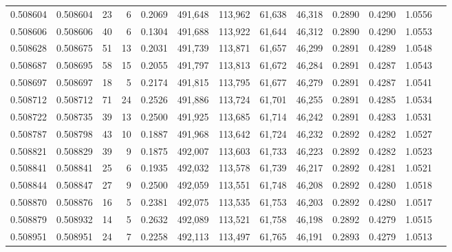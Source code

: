 \begin{tabular}{rrrrrrrrrrrrr}
0.508604 & 0.508604 &    23 &     6 &                                     0.2069 & 491,648 & 113,962 &  61,638 &  46,318 & 0.2890 & 0.4290 & 1.0556 \\
0.508606 & 0.508606 &    40 &     6 &                                     0.1304 & 491,688 & 113,922 &  61,644 &  46,312 & 0.2890 & 0.4290 & 1.0553 \\
0.508628 & 0.508675 &    51 &    13 &                                     0.2031 & 491,739 & 113,871 &  61,657 &  46,299 & 0.2891 & 0.4289 & 1.0548 \\
0.508687 & 0.508695 &    58 &    15 &                                     0.2055 & 491,797 & 113,813 &  61,672 &  46,284 & 0.2891 & 0.4287 & 1.0543 \\
0.508697 & 0.508697 &    18 &     5 &                                     0.2174 & 491,815 & 113,795 &  61,677 &  46,279 & 0.2891 & 0.4287 & 1.0541 \\
0.508712 & 0.508712 &    71 &    24 &                                     0.2526 & 491,886 & 113,724 &  61,701 &  46,255 & 0.2891 & 0.4285 & 1.0534 \\
0.508722 & 0.508735 &    39 &    13 &                                     0.2500 & 491,925 & 113,685 &  61,714 &  46,242 & 0.2891 & 0.4283 & 1.0531 \\
0.508787 & 0.508798 &    43 &    10 &                                     0.1887 & 491,968 & 113,642 &  61,724 &  46,232 & 0.2892 & 0.4282 & 1.0527 \\
0.508821 & 0.508829 &    39 &     9 &                                     0.1875 & 492,007 & 113,603 &  61,733 &  46,223 & 0.2892 & 0.4282 & 1.0523 \\
0.508841 & 0.508841 &    25 &     6 &                                     0.1935 & 492,032 & 113,578 &  61,739 &  46,217 & 0.2892 & 0.4281 & 1.0521 \\
0.508844 & 0.508847 &    27 &     9 &                                     0.2500 & 492,059 & 113,551 &  61,748 &  46,208 & 0.2892 & 0.4280 & 1.0518 \\
0.508870 & 0.508876 &    16 &     5 &                                     0.2381 & 492,075 & 113,535 &  61,753 &  46,203 & 0.2892 & 0.4280 & 1.0517 \\
0.508879 & 0.508932 &    14 &     5 &                                     0.2632 & 492,089 & 113,521 &  61,758 &  46,198 & 0.2892 & 0.4279 & 1.0515 \\
0.508951 & 0.508951 &    24 &     7 &                                     0.2258 & 492,113 & 113,497 &  61,765 &  46,191 & 0.2893 & 0.4279 & 1.0513 \\

\end{tabular}
